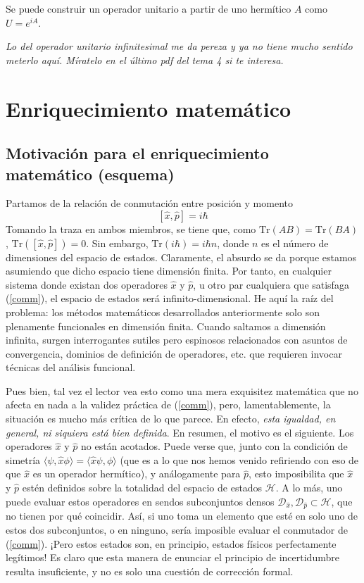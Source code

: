 \documentclass[12pt]{report}
\begin{document}
Se puede construir un operador unitario a partir de uno hermítico $A$ como $U=e^{iA}$.


\textit{Lo del operador unitario infinitesimal me da pereza y ya no tiene mucho sentido meterlo aquí. Míratelo en el último pdf del tema 4 si te interesa.}



\chapter{Enriquecimiento matemático}
\section{Motivación para el enriquecimiento matemático (esquema)}

Partamos de la relación de conmutación entre posición y momento
\begin{equation}
\label{comm}
    [\hat{x},\hat{p}] = i\hbar
\end{equation}
Tomando la traza en ambos miembros, se tiene que, como $\mathrm{Tr}(AB)=\mathrm{Tr}(BA)$, $\mathrm{Tr}([\hat{x},\hat{p}])=0$. Sin embargo, $\mathrm{Tr}(i\hbar)=i\hbar n$, donde $n$ es el número de dimensiones del espacio de estados. Claramente, el absurdo se da porque estamos asumiendo que dicho espacio tiene dimensión finita. Por tanto, en cualquier sistema donde existan dos operadores $\hat{x}$ y $\hat{p}$, u otro par cualquiera que satisfaga (\ref{comm}), el espacio de estados será infinito-dimensional. He aquí la raíz del problema: los métodos matemáticos desarrollados anteriormente solo son plenamente funcionales en dimensión finita. Cuando saltamos a dimensión infinita, surgen interrogantes sutiles pero espinosos relacionados con asuntos de convergencia, dominios de definición de operadores, etc. que requieren invocar técnicas del análisis funcional. \newline

Pues bien, tal vez el lector vea esto como una mera exquisitez matemática que no afecta en nada a la validez práctica de (\ref{comm}), pero, lamentablemente, la situación es mucho más crítica de lo que parece. En efecto, \textit{esta igualdad, en general, ni siquiera está bien definida}. En resumen, el motivo es el siguiente. Los operadores $\hat{x}$ y $\hat{p}$ no están acotados. Puede verse que, junto con la condición de simetría $\langle \psi, \hat{x} \phi \rangle = \langle \hat{x} \psi, \phi \rangle$ (que es a lo que nos hemos venido refiriendo con eso de que $\hat{x}$ es un operador hermítico), y análogamente para $\hat{p}$, esto imposibilita que $\hat{x}$ y $\hat{p}$ estén definidos sobre la totalidad del espacio de estados $\mathcal{H}$. A lo más, uno puede evaluar estos operadores en sendos subconjuntos densos $\mathcal{D}_{\hat{x}}, \mathcal{D}_{\hat{p}} \subset \mathcal{H}$, que no tienen por qué coincidir. Así, si uno toma un elemento que esté en solo uno de estos dos subconjuntos, o en ninguno, sería imposible evaluar el conmutador de (\ref{comm}). ¡Pero estos estados son, en principio, estados físicos perfectamente legítimos! Es claro que esta manera de enunciar el principio de incertidumbre resulta insuficiente, y no es solo una cuestión de corrección formal. \newline
\end{document}
